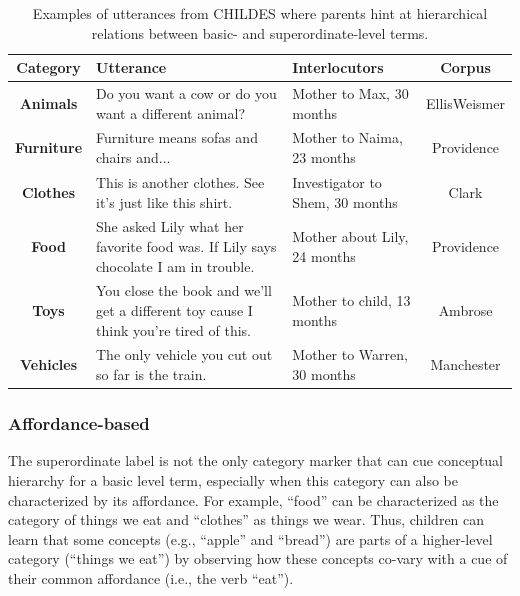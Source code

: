 \documentclass[english,,man]{apa6}
\begin{document}
\begin{table}[!htbp] \centering 

\caption{\label{tab:pragmatic} Examples of utterances from CHILDES where parents hint at hierarchical relations between basic- and superordinate-level terms.}

\begin{tabularx}{\linewidth}{cXXc}
\hline
\textbf{Category} & Utterance & Interlocutors & Corpus\\
\hline

\textbf{Animals} & Do you want a cow or do you want a different animal? & Mother to Max, 30 months & EllisWeismer\\

\textbf{Furniture} & Furniture means sofas and chairs and... & Mother to Naima, 23 months & Providence\\

\textbf{Clothes} & This is another clothes. See it's just like this shirt. & Investigator to Shem, 30 months & Clark\\

\textbf{Food} & She asked Lily what her favorite food was. If Lily says chocolate I am in trouble. & Mother about Lily, 24 months & Providence\\

\textbf{Toys} & You close the book and we'll get a different toy cause I think you're tired of this. & Mother to child, 13 months & Ambrose\\

\textbf{Vehicles} & The only vehicle you cut out so far is the train. & Mother to Warren, 30 months & Manchester\\

\hline
\end{tabularx}

\end{table}

\hypertarget{affordance-based}{%
\subsubsection{Affordance-based}\label{affordance-based}}

The superordinate label is not the only category marker that can cue conceptual hierarchy for a basic level term, especially when this category can also be characterized by its affordance. For example, \enquote{food} can be characterized as the category of things we eat and \enquote{clothes} as things we wear. Thus, children can learn that some concepts (e.g., \enquote{apple} and \enquote{bread}) are parts of a higher-level category (\enquote{things we eat}) by observing how these concepts co-vary with a cue of their common affordance (i.e., the verb \enquote{eat}).
\end{document}
